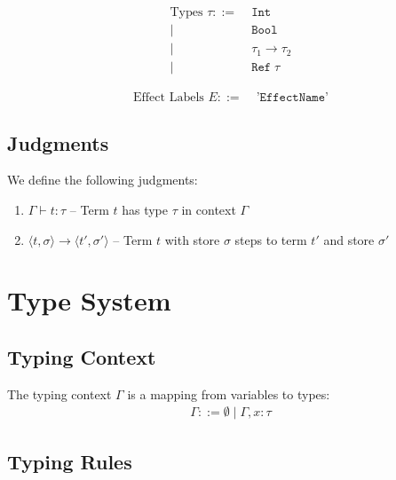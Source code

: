 \documentclass{article}
\begin{document}
\begin{align}
\text{Types } \tau ::= &\; \texttt{Int} \tag{integers} \\
                    | &\; \texttt{Bool} \tag{booleans} \\
                    | &\; \tau_1 \rightarrow \tau_2 \tag{function types} \\
                    | &\; \texttt{Ref} \; \tau \tag{reference types}
\end{align}

\begin{align}
\text{Effect Labels } E ::= &\; \texttt{'EffectName'}
\end{align}

\subsection{Judgments}

We define the following judgments:

\begin{enumerate}
  \item $\Gamma \vdash t : \tau$ -- Term $t$ has type $\tau$ in context $\Gamma$
  \item $\langle t, \sigma \rangle \longrightarrow \langle t', \sigma' \rangle$ -- Term $t$ with store $\sigma$ steps to term $t'$ and store $\sigma'$
\end{enumerate}

\section{Type System}

\subsection{Typing Context}

The typing context $\Gamma$ is a mapping from variables to types:
\begin{align}
\Gamma ::= \emptyset \; | \; \Gamma, x : \tau
\end{align}

\subsection{Typing Rules}
\end{document}
